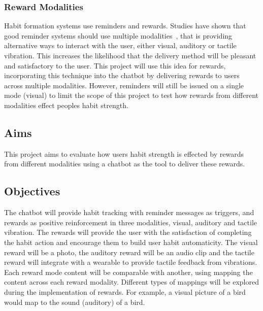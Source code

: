 \subsubsection*{Reward Modalities}
Habit formation systems use reminders and rewards.
Studies have shown that good reminder systems should use multiple modalities~\cite{article_designing_multimodal_reminders_for_home},
that is providing alternative ways to interact with the user, either visual, auditory or tactile vibration.
This increases the likelihood that the delivery method will be pleasant and satisfactory to the user.
This project will use this idea for rewards, incorporating this technique into the chatbot by delivering rewards to users across multiple modalities.
However, reminders will still be issued on a single mode (visual) to limit the scope of this project to test how rewards from different modalities effect peoples habit strength.

\subsection*{Aims}
This project aims to evaluate how users habit strength is effected by rewards from different modalities using a chatbot as the tool to deliver these rewards.

\subsection*{Objectives}
The chatbot will provide habit tracking with reminder messages as triggers, and rewards as positive reinforcement in three modalities, visual, auditory and tactile vibration.\newline
\newline
The rewards will provide the user with the satisfaction of completing the habit action and encourage them to build user habit automaticity.
The visual reward will be a photo, the auditory reward will be an audio clip and the tactile reward will integrate with a wearable to provide tactile feedback from vibrations.
Each reward mode content will be comparable with another, using mapping the content across each reward modality. Different types of mappings will be explored during the implementation of rewards.
For example, a visual picture of a bird would map to the sound (auditory) of a bird.

